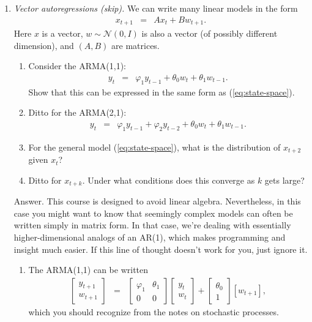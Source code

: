 \documentclass[11pt]{article}
\begin{document}
\begin{enumerate}
\item {\it Vector autoregressions (skip).\/}
We can write many linear models in the form
\begin{eqnarray}
    x_{t+1} &=& A x_t + B w_{t+1} .
    \label{eq:state-space}
\end{eqnarray}
Here $x$ is a vector, $w \sim \mathcal{N}(0,I)$
is also a vector (of possibly different dimension),
and $(A,B)$ are matrices.
%
\begin{enumerate}
\item Consider the ARMA(1,1):
\begin{eqnarray*}
    y_t &=& \varphi_1 y_{t-1} + \theta_0 w_t + \theta_1 w_{t-1} .
\end{eqnarray*}
Show that this can be expressed in the same form as (\ref{eq:state-space}).
\item Ditto for the ARMA(2,1):
\begin{eqnarray*}
    y_t &=& \varphi_1 y_{t-1} + \varphi_2 y_{t-2} + \theta_0 w_t + \theta_1 w_{t-1} .
\end{eqnarray*}
\item For the general model (\ref{eq:state-space}),
what is the distribution of $x_{t+2}$ given $x_t$?
\item Ditto for $x_{t+k}$.
Under what conditions does this converge as $k$ gets large?
\end{enumerate}
%
Answer.
This course is designed to avoid linear algebra.
Nevertheless, in this case you might want to know
that seemingly complex models can often
be written simply in matrix form.
In that case, we're dealing with essentially higher-dimensional
analogs of an AR(1), which makes programming and insight much easier.
If this line of thought doesn't work for you, just ignore it.
%
\begin{enumerate}
\item The ARMA(1,1) can be written
\begin{eqnarray*}
    \left[
    \begin{array}{c}
    y_{t+1} \\ w_{t+1}
    \end{array}
    \right]
    &=&
    \left[
    \begin{array}{cc}
    \varphi_1 & \theta_1 \\ 0 & 0
    \end{array}
    \right]
    \left[
    \begin{array}{c}
    y_{t} \\ w_{t}
    \end{array}
    \right]
    +
    \left[
    \begin{array}{c}
    \theta_0 \\ 1
    \end{array}
    \right]
    [w_{t+1} ] ,
\end{eqnarray*}
which you should recognize from the notes on stochastic processes.


\end{enumerate}
\end{enumerate}
\end{document}
